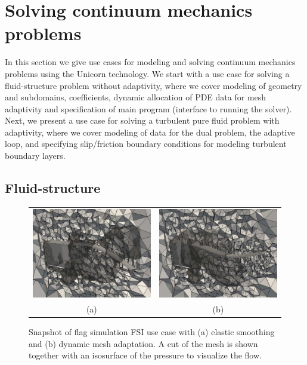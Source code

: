 \section{Solving continuum mechanics problems}

In this section we give use cases for modeling and solving continuum
mechanics problems using the Unicorn technology. We start with a use
case for solving a fluid-structure problem without adaptivity, where
we cover modeling of geometry and subdomains, coefficients, dynamic
allocation of PDE data for mesh adaptivity and specification of main
program (interface to running the solver). Next, we present a use case
for solving a turbulent pure fluid problem with adaptivity, where we
cover modeling of data for the dual problem, the adaptive loop, and
specifying slip/friction boundary conditions for modeling turbulent
boundary layers.


\subsection{Fluid-structure}

\begin{figure}[!ht]
\begin{center}
\begin{tabular}{cc}
\includegraphics[width=0.5\linewidth]{chapters/hoffman-2/pdf/flag_smooth05.pdf} &
\includegraphics[width=0.5\linewidth]{chapters/hoffman-2/pdf/flag_hybrid05.pdf}\\
(a) & (b)
\end{tabular}
\end{center}
\caption{Snapshot of flag simulation FSI use case with (a) elastic smoothing and
  (b) dynamic mesh adaptation. A cut of the mesh is shown together with an
  isosurface of the pressure to visualize the flow.}
\label{fig:flag_snapshot}
\end{figure}

